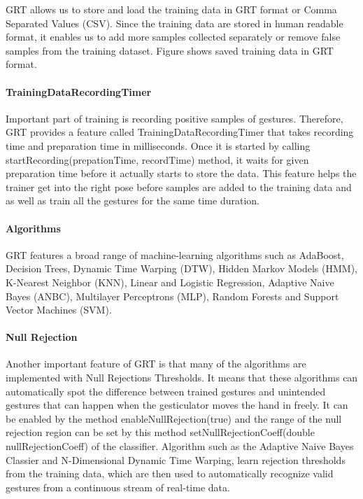  \label{code:grt:class}

GRT allows us to store and load the training data in GRT format or Comma Separated Values (CSV). Since the training data are stored in human readable format, it enables us to add more samples collected separately or remove false samples from the training dataset. Figure shows saved training data in GRT format.

\paragraph*{TrainingDataRecordingTimer} Important part of training is recording positive samples of gestures. Therefore, GRT provides a feature called TrainingDataRecordingTimer that takes recording time and preparation time in milliseconds. Once it is started by calling startRecording(prepationTime, recordTime) method, it waits for given preparation time before it actually starts to store the data. This feature helps the trainer get into the right pose before samples are added to the training data and as well as train all the gestures for the same time duration.

\paragraph*{Algorithms} GRT features a broad range of machine-learning algorithms such as AdaBoost, Decision Trees, Dynamic Time Warping (DTW), Hidden Markov Models (HMM), K-Nearest Neighbor (KNN), Linear and Logistic Regression, Adaptive Naive Bayes (ANBC), Multilayer Perceptrons (MLP), Random Forests and Support Vector Machines (SVM). 

\paragraph*{Null Rejection} Another important feature of GRT is that many of the algorithms are implemented with Null Rejections Thresholds. It means that these algorithms can automatically spot the difference between trained gestures and unintended gestures that can happen when the gesticulator moves the hand in freely. It can be enabled by the method enableNullRejection(true) and the range of the null rejection region can be set by this method setNullRejectionCoeff(double nullRejectionCoeff) of the classifier. Algorithm such as the Adaptive Naive Bayes Classier and N-Dimensional Dynamic Time Warping, learn rejection thresholds from the training data, which are then used to automatically recognize valid gestures from a continuous stream of real-time data.

